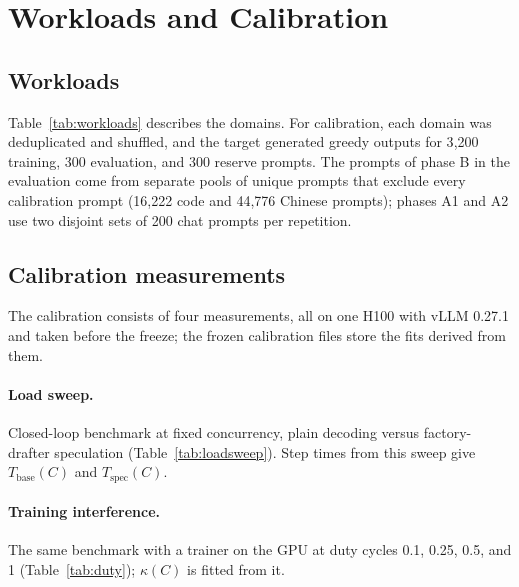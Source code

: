 \FloatBarrier
\section{Workloads and Calibration}\label{app:calibration}

\subsection{Workloads}\label{app:workloads}

Table~\ref{tab:workloads} describes the domains. For calibration, each domain was deduplicated and shuffled, and the target generated greedy outputs for 3{,}200 training, 300 evaluation, and 300 reserve prompts. The prompts of phase B in the evaluation come from separate pools of unique prompts that exclude every calibration prompt (16{,}222 code and 44{,}776 Chinese prompts); phases A1 and A2 use two disjoint sets of 200 chat prompts per repetition.

\begin{table}[!htbp]
\caption{Domains. Token counts are means over the target's greedy outputs (Qwen3-8B); \emph{Truncated} is the share of outputs that hit the 512-token limit; \emph{Coverage} is the share of target output tokens inside the 32k draft vocabulary. MATH-500 is used only for the long-output sweep, with thinking enabled and outputs of up to 4{,}096 tokens.}
\label{tab:workloads}
\centering\footnotesize\setlength{\tabcolsep}{4pt}

\end{table}

\FloatBarrier
\subsection{Calibration measurements}

The calibration consists of four measurements, all on one H100 with vLLM 0.27.1 and taken before the freeze; the frozen calibration files store the fits derived from them.

\paragraph{Load sweep.} Closed-loop benchmark at fixed concurrency, plain decoding versus factory-drafter speculation (Table~\ref{tab:loadsweep}). Step times from this sweep give $T_{\mathrm{base}}(C)$ and $T_{\mathrm{spec}}(C)$.

\paragraph{Training interference.} The same benchmark with a trainer on the GPU at duty cycles 0.1, 0.25, 0.5, and 1 (Table~\ref{tab:duty}); $\kappa(C)$ is fitted from it.

